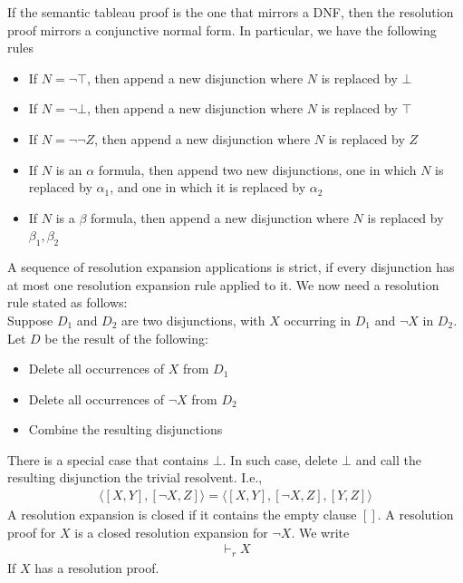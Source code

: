 \documentclass[a4paper]{article}
\theoremstyle{plain}
\theoremstyle{definition}
\newtheorem{defn}{Definition}[section]
\theoremstyle{remark}
\begin{document}
\begin{tcolorbox}[colback=black!3!white,colframe=black!60!white,title=\begin{defn}Resolution Proof \label{Resolution Proof}\end{defn}]
If the semantic tableau proof is the one that mirrors a DNF, then the resolution proof mirrors a conjunctive normal form. In particular, we have the following rules
\begin{itemize}
	\item If $N = \neg \top$, then append a new disjunction where $N$ is replaced by $\bot$ 
	\item If $N = \neg \bot$, then append a new disjunction where $N$ is replaced by $\top$ 
	\item If $N = \neg \neg Z$, then append a new disjunction where $N$ is replaced by $Z$
	\item If $N$ is an $\alpha$ formula, then append two new disjunctions, one in which $N$ is replaced by $\alpha_1$, and one in which it is replaced by $\alpha_2$
	\item If $N$ is a $\beta$ formula, then append a new disjunction where $N$ is replaced by $\beta_1, \beta_2$
\end{itemize}
A sequence of resolution expansion applications is strict, if every disjunction has at most one resolution expansion rule applied to it. We now need a resolution rule stated as follows:\\
Suppose $D_1$ and $D_2$ are two disjunctions, with $X$ occurring in $D_1$ and $\neg X$ in $D_2$. Let $D$ be the result of the following:
\begin{itemize}
	\item Delete all occurrences of $X$ from $D_1$ 
	\item Delete all occurrences of $\neg X$ from $D_2$ 
	\item Combine the resulting disjunctions
\end{itemize}
There is a special case that contains $\bot$. In such case, delete $\bot$ and call the resulting disjunction the trivial resolvent. I.e.,
\begin{align}
	\langle [X,Y],[\neg X, Z] \rangle = \langle[X,Y],[\neg X, Z], [Y, Z] \rangle
\end{align}
A resolution expansion is closed if it contains the empty clause $[]$. A resolution proof for $X$ is a closed resolution expansion for $\neg X$. We write
\begin{align}
	\vdash_r X
\end{align}
If $X$ has a resolution proof.
\end{tcolorbox}
\end{document}
